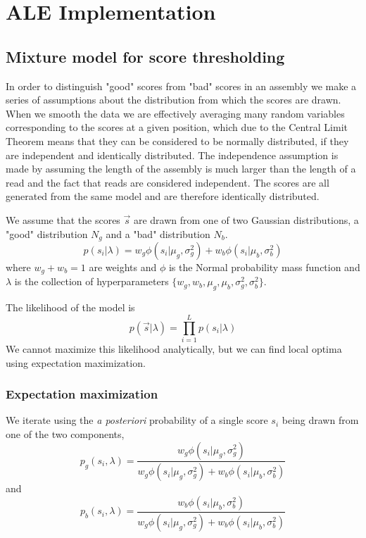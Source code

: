 \documentclass[phd,tocprelim]{cornell}
\begin{document}

\chapter{ALE Implementation} %
\label{cha:ALE Implementation}

\section{Mixture model for score thresholding}

In order to distinguish "good" scores from "bad" scores in an assembly we make a series of assumptions about the distribution from which the scores are drawn. When we smooth the data we are effectively averaging many random variables corresponding to the scores at a given position, which due to the Central Limit Theorem means that they can be considered to be normally distributed, if they are independent and identically distributed. The independence assumption is made by assuming the length of the assembly is much larger than the length of a read and the fact that reads are considered independent. The scores are all generated from the same model and are therefore identically distributed.

We assume that the scores $\vec{s}$ are drawn from one of two Gaussian distributions, a "good" distribution $N_{g}$ and a "bad" distribution $N_{b}$.
\begin{equation}
    p\left(s_{i}|\lambda\right) = w_{g} \phi\left(s_{i} | \mu_{g}, \sigma^{2}_{g}\right) + w_{b} \phi\left(s_{i} | \mu_{b}, \sigma^{2}_{b}\right)
\end{equation}
where $w_{g} + w_{b} = 1$ are weights and $\phi$ is the Normal probability mass function and $\lambda$ is the collection of hyperparameters $\{w_{g}, w_{b}, \mu_{g}, \mu_{b}, \sigma^{2}_{g}, \sigma^{2}_{b}\}$.

The likelihood of the model is
\begin{equation}
    p\left(\vec{s}|\lambda\right) = \prod_{i=1}^{L} p\left(s_{i}|\lambda\right)
\end{equation}
We cannot maximize this likelihood analytically, but we can find local optima using expectation maximization.

\subsection{Expectation maximization}

We iterate using the {\it a posteriori} probability of a single score $s_{i}$ being drawn from one of the two components,
\begin{equation}
    p_{g}(s_{i}, \lambda) = \frac{w_{g} \phi\left(s_{i} | \mu_{g}, \sigma^{2}_{g}\right)}{w_{g} \phi\left(s_{i} | \mu_{g}, \sigma^{2}_{g}\right) + w_{b} \phi\left(s_{i} | \mu_{b}, \sigma^{2}_{b}\right)}
\end{equation}
and
\begin{equation}
    p_{b}(s_{i}, \lambda) = \frac{w_{b} \phi\left(s_{i} | \mu_{b}, \sigma^{2}_{b}\right)}{w_{g} \phi\left(s_{i} | \mu_{g}, \sigma^{2}_{g}\right) + w_{b} \phi\left(s_{i} | \mu_{b}, \sigma^{2}_{b}\right)}
\end{equation}
\end{document}
